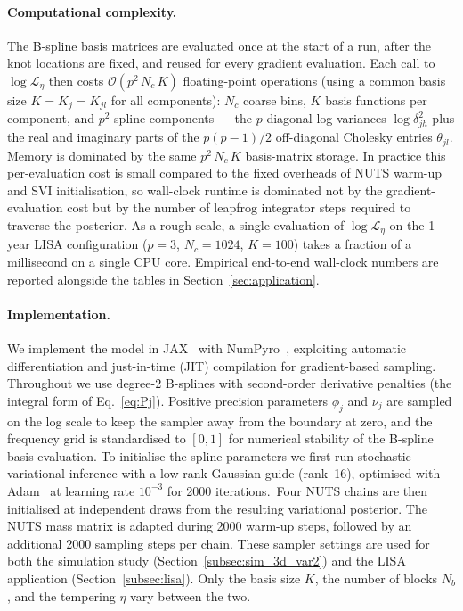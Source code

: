 \documentclass[%
	reprint,
	nofootinbib,
	amsmath,
	amssymb,
	aps,
]{revtex4-2}
\DeclareRobustCommand{\codelink}[1]{\,\href{#1}{\mbox{\scalebox{0.65}{\faGithub}}}}
\begin{document}
	\paragraph{Computational complexity.}
	The B-spline basis matrices are evaluated once at the start of a run,
	after the knot locations are fixed, and reused for every gradient
	evaluation. Each call to $\log\mathcal{L}_{\eta}$ then costs
	$\mathcal{O}(p^{2}\,N_{c}\,K)$ floating-point operations (using a common
	basis size $K = K_j = K_{jl}$ for all components):
	$N_{c}$ coarse bins, $K$ basis functions per component, and $p^{2}$ spline
	components --- the $p$ diagonal log-variances $\log\delta_{jh}^{2}$
	plus the real and imaginary parts of the $p(p-1)/2$ off-diagonal
	Cholesky entries $\theta_{jl}$. Memory is dominated by the same
	$p^{2}\,N_{c}\,K$ basis-matrix storage. In practice this
	per-evaluation cost is small compared to the fixed overheads of NUTS
	warm-up and SVI initialisation, so wall-clock runtime is dominated
	not by the gradient-evaluation cost but by the number of leapfrog
	integrator steps required to traverse the posterior. As a rough
	scale, a single evaluation of $\log\mathcal{L}_{\eta}$ on the 1-year
	LISA configuration ($p=3$, $N_{c}=1024$, $K=100$) takes a fraction
	of a millisecond on a single CPU core. Empirical end-to-end
	wall-clock numbers are reported alongside the tables in
	Section~\ref{sec:application}.


	\paragraph{Implementation.}
	We implement the model in \textsc{JAX}~\cite{jax2018github} with
	NumPyro~\cite{phan2019numphyro}, exploiting automatic differentiation
	and just-in-time (JIT) compilation for gradient-based sampling.
	Throughout we use degree-2 B-splines with second-order derivative
	penalties (the integral form of Eq.~\eqref{eq:Pj}). Positive
	precision parameters $\phi_{j}$ and $\nu_{j}$ are sampled on the
	log scale to keep the sampler away from the boundary at zero, and
	the frequency grid is standardised to $[0,1]$ for numerical
	stability of the B-spline basis evaluation. To initialise the spline
	parameters we first run stochastic variational inference
	\citep[SVI;][]{hoffman2013_SVI} with a low-rank Gaussian guide
	(rank~16), optimised with Adam~\citep{Kingma2015} at learning rate
	$10^{-3}$ for 2000
	iterations.\codelink{https://github.com/nz-gravity/LogPSplinePSD/blob/v0.1.0/src/log_psplines/pipeline/vi.py\#L134}
	Four NUTS chains are then initialised
	at independent draws from the resulting variational posterior. The
	NUTS mass matrix is adapted during 2000 warm-up steps, followed by
	an additional 2000 sampling steps per chain. These sampler settings
	are used for both the simulation study
	(Section~\ref{subsec:sim_3d_var2}) and the LISA application
	(Section~\ref{subsec:lisa}). Only the basis size $K$, the number of
	blocks $N_{b}$, and the tempering $\eta$ vary between the two.
\end{document}
